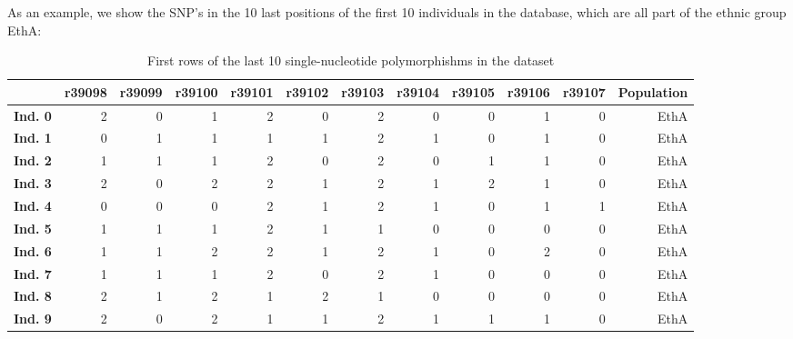 \documentclass[a4paper, 11pt]{article}
\theoremstyle{definition}
\theoremstyle{remark}
\begin{document}
As an example, we show the SNP's in the 10 last positions of the first 10 individuals in the database, which are all part of the ethnic group EthA:


\begin{table}[!h]
\renewcommand{\arraystretch}{1.5}
\begin{adjustbox}{width=1\textwidth}
\begin{tabular}{lrrrrrrrrrrr}
{} &  \textbf{r39098} &  \textbf{r39099} &  \textbf{r39100} &  \textbf{r39101} &  \textbf{r39102} &  \textbf{r39103} &  \textbf{r39104} &  \textbf{r39105} &  \textbf{r39106} &  \textbf{r39107} & \textbf{Population}\\
\hline
\textbf{Ind. 0}    &   2 &       0 &       1 &       2 &       0 &       2 &       0 &       0 &       1 &       0 &       EthA \\
\textbf{Ind. 1}    &   0 &       1 &       1 &       1 &       1 &       2 &       1 &       0 &       1 &       0 &       EthA \\
\textbf{Ind. 2}    &   1 &       1 &       1 &       2 &       0 &       2 &       0 &       1 &       1 &       0 &       EthA \\
\textbf{Ind. 3}    &   2 &       0 &       2 &       2 &       1 &       2 &       1 &       2 &       1 &       0 &       EthA \\
\textbf{Ind. 4}    &   0 &       0 &       0 &       2 &       1 &       2 &       1 &       0 &       1 &       1 &       EthA \\
\textbf{Ind. 5}    &   1 &       1 &       1 &       2 &       1 &       1 &       0 &       0 &       0 &       0 &       EthA \\
\textbf{Ind. 6}    &   1 &       1 &       2 &       2 &       1 &       2 &       1 &       0 &       2 &       0 &       EthA \\
\textbf{Ind. 7}    &   1 &       1 &       1 &       2 &       0 &       2 &       1 &       0 &       0 &       0 &       EthA \\
\textbf{Ind. 8}    &   2 &       1 &       2 &       1 &       2 &       1 &       0 &       0 &       0 &       0 &       EthA \\
\textbf{Ind. 9}    &   2 &       0 &       2 &       1 &       1 &       2 &       1 &       1 &       1 &       0 &       EthA \\
\end{tabular}
\end{adjustbox}
\caption{First rows of the last 10 single-nucleotide polymorphishms in the dataset}
\end{table}
\end{document}
